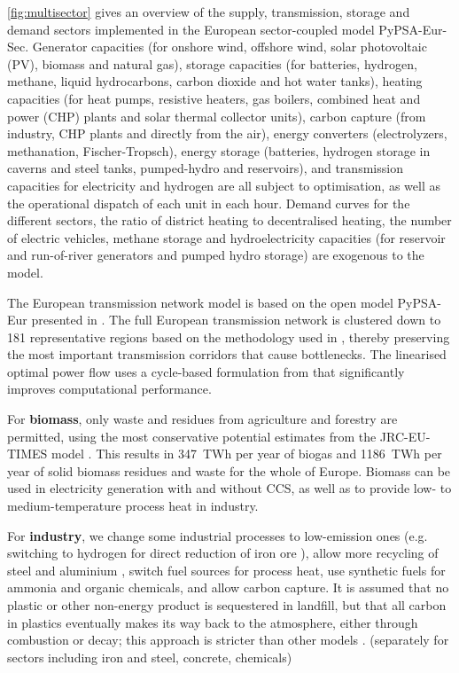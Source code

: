 \cref{fig:multisector} gives an overview of the supply, transmission, storage
and demand sectors implemented in the European sector-coupled model
PyPSA-Eur-Sec. Generator capacities (for onshore wind, offshore wind, solar
photovoltaic (PV), biomass and natural gas), storage capacities (for batteries,
hydrogen, methane, liquid hydrocarbons, carbon dioxide and hot water tanks),
heating capacities (for heat pumps, resistive heaters, gas boilers, combined
heat and power (CHP) plants and solar thermal collector units), carbon capture
(from industry, CHP plants and directly from the air), energy converters
(electrolyzers, methanation, Fischer-Tropsch), energy storage (batteries,
hydrogen storage in caverns and steel tanks, pumped-hydro and reservoirs), and
transmission capacities for electricity and hydrogen are all subject to
optimisation, as well as the operational dispatch of each unit in each hour.
Demand curves for the different sectors, the ratio of district heating to
decentralised heating, the number of electric vehicles, methane storage and
hydroelectricity capacities (for reservoir and run-of-river generators and
pumped hydro storage) are exogenous to the model.

The European transmission network model is based on the open model PyPSA-Eur
presented in \cite{horschPyPSAEurOpen2018}. The full European transmission network is clustered
down to 181 representative regions based on the methodology used in
\cite{Hoersch2017,frysztackiStrongEffect2021}, thereby preserving the most important transmission corridors
that cause bottlenecks. The linearised optimal power flow uses a cycle-based
formulation from \cite{horschLinearOptimal2018} that significantly improves computational
performance.

For \textbf{biomass}, only waste and residues from agriculture and forestry are
permitted, using the most conservative potential estimates from the JRC-EU-TIMES
model \cite{jrcbiomass2015}. This results in 347~TWh per year of biogas and
1186~TWh per year of solid biomass residues and waste for the whole of Europe.
Biomass can be used in electricity generation with and
without CCS, as well as to provide low- to medium-temperature process heat in
industry.

For \textbf{industry}, we change some industrial processes to low-emission ones (e.g.
switching to hydrogen for direct reduction of iron ore \cite{voglAssessmentHydrogen2018}), allow
more recycling of steel and aluminium \cite{circular_economy}, switch fuel
sources for process heat, use synthetic fuels for ammonia and organic chemicals,
and allow carbon capture. It is assumed that no plastic or other non-energy
product is sequestered in landfill, but that all carbon in plastics eventually
makes its way back to the atmosphere, either through combustion or decay; this
approach is stricter than other models \cite{in-depth_2018}.
(separately for sectors including iron and steel, concrete, chemicals)

